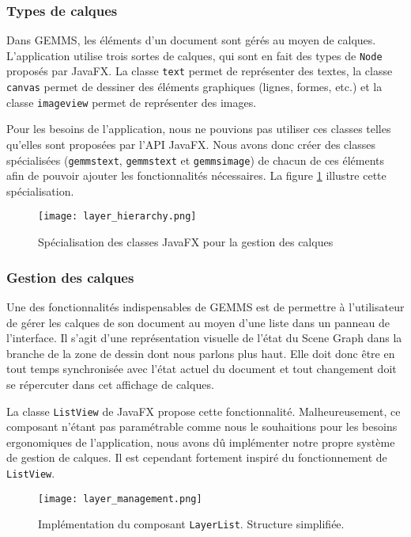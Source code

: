 \subsubsection{Types de calques}
Dans GEMMS, les éléments d'un document sont gérés au moyen de calques. L'application utilise trois sortes de calques, qui sont en fait des types de \texttt{Node} proposés par JavaFX. La classe \texttt{\gls{text}} permet de représenter des textes, la classe \texttt{\gls{canvas}} permet de dessiner des éléments graphiques (lignes, formes, etc.) et la classe \texttt{\gls{imageview}} permet de représenter des images. 

Pour les besoins de l'application, nous ne pouvions pas utiliser ces classes telles qu'elles sont proposées par l'API JavaFX. Nous avons donc créer des classes spécialisées (\texttt{\gls{gemmstext}}, \texttt{\gls{gemmstext}} et  \texttt{\gls{gemmsimage}}) de chacun de ces éléments afin de pouvoir ajouter les fonctionnalités nécessaires. La figure \ref{fig:layer_hierarchy} illustre cette spécialisation.

\begin{figure}[H]
	\caption{Spécialisation des classes JavaFX pour la gestion des calques}
	\centering
	\texttt{[image: layer\_hierarchy.png]}
	\label{fig:layer_hierarchy}
\end{figure}


\subsubsection{Gestion des calques}

Une des fonctionnalités indispensables de GEMMS est de permettre à l'utilisateur de gérer les calques de son document au moyen d'une liste dans un panneau de l'interface. Il s'agit d'une représentation visuelle de l'état du Scene Graph dans la branche de la zone de dessin dont nous parlons plus haut. Elle doit donc être en tout temps synchronisée avec l'état actuel du document et tout changement doit se répercuter dans cet affichage de calques.

La classe \texttt{ListView} de JavaFX propose cette fonctionnalité. Malheureusement, ce composant n'étant pas paramétrable comme nous le souhaitions pour les besoins ergonomiques de l'application, nous avons dû implémenter notre propre système de gestion de calques. Il est cependant fortement inspiré du fonctionnement de \texttt{ListView}.

\begin{figure}[H]
	\caption{Implémentation du composant \texttt{LayerList}. Structure simplifiée.}
	\centering
	\texttt{[image: layer\_management.png]}
	\label{fig:layer_management}
\end{figure}

